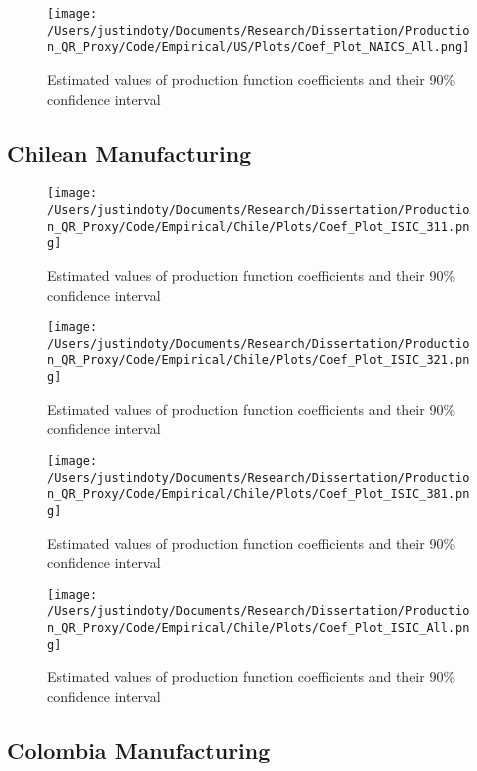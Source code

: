 \documentclass[11pt]{article}
\begin{document}
\begin{figure}[H]
\centering
\caption{Estimated values of production function coefficients and their 90\% confidence interval}
\texttt{[image: /Users/justindoty/Documents/Research/Dissertation/Production\_QR\_Proxy/Code/Empirical/US/Plots/Coef\_Plot\_NAICS\_All.png]}
\end{figure}

\subsection{Chilean Manufacturing}




\begin{figure}[H]
\centering
\caption{Estimated values of production function coefficients and their 90\% confidence interval}
\texttt{[image: /Users/justindoty/Documents/Research/Dissertation/Production\_QR\_Proxy/Code/Empirical/Chile/Plots/Coef\_Plot\_ISIC\_311.png]}
\end{figure}

\begin{figure}[H]
\centering
\caption{Estimated values of production function coefficients and their 90\% confidence interval}
\texttt{[image: /Users/justindoty/Documents/Research/Dissertation/Production\_QR\_Proxy/Code/Empirical/Chile/Plots/Coef\_Plot\_ISIC\_321.png]}
\end{figure}

\begin{figure}[H]
\centering
\caption{Estimated values of production function coefficients and their 90\% confidence interval}
\texttt{[image: /Users/justindoty/Documents/Research/Dissertation/Production\_QR\_Proxy/Code/Empirical/Chile/Plots/Coef\_Plot\_ISIC\_381.png]}
\end{figure}

\begin{figure}[H]
\centering
\caption{Estimated values of production function coefficients and their 90\% confidence interval}
\texttt{[image: /Users/justindoty/Documents/Research/Dissertation/Production\_QR\_Proxy/Code/Empirical/Chile/Plots/Coef\_Plot\_ISIC\_All.png]}
\end{figure}

\subsection{Colombia Manufacturing}
\end{document}
